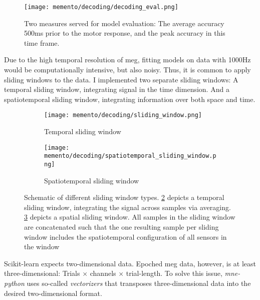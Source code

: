\begin{figure}
	\texttt{[image: memento/decoding/decoding\_eval.png]}
	\caption[Decoding evaluation]{Two measures served for model evaluation: The average accuracy 500ms prior to the motor response, and the peak accuracy in this time frame.}
	\label{fig:opti-eval}
\end{figure}


Due to the high temporal resolution of \gls{meg}, fitting models on data with 1000Hz would be computationally intensive, but also noisy.
Thus, it is common to apply sliding windows to the data.
I implemented two separate sliding windows: A temporal sliding window, integrating signal in the time dimension.
And a spatiotemporal sliding window, integrating information over both space and time.

\begin{figure}
	\begin{subfigure}{0.6\textwidth}
		\texttt{[image: memento/decoding/sliding\_window.png]}
		\caption{Temporal sliding window}
		\label{fig:temporal-slider}
	\end{subfigure}
	\begin{subfigure}{0.4\textwidth}
		\texttt{[image: memento/decoding/spatiotemporal\_sliding\_window.png]}
		\caption{Spatiotemporal sliding window}
		\label{fig:spatiotemporal-slider}
	\end{subfigure}
	\caption[Schematic of different sliding window types]{Schematic of different sliding window types. \ref{fig:temporal-slider} depicts a temporal sliding window, integrating the signal across samples via averaging. \ref{fig:spatiotemporal-slider} depicts a spatial sliding window. All samples in the sliding window are concatenated such that the one resulting sample per sliding window includes the spatiotemporal configuration of all sensors in the window}
	\label{fig:sliding-windows}
\end{figure}

Scikit-learn expects two-dimensional data.
Epoched \gls{meg} data, however, is at least three-dimensional: Trials $\times$ channels $\times$ trial-length.
To solve this issue, \textit{mne-python} uses so-called \textit{vectorizers} that transposes three-dimensional data into the desired two-dimensional format.

